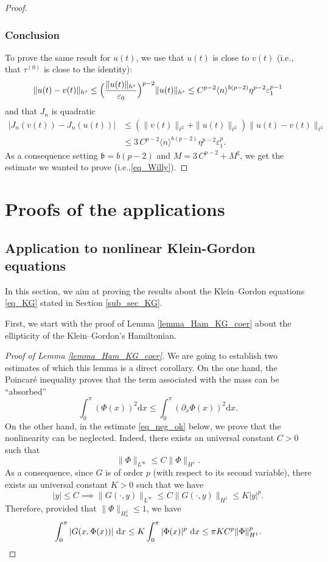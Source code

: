 \documentclass[11pt]{article}
\newcommand{\ie}{i.e.,\xspace}
\theoremstyle{definition}
\begin{document}
\begin{proof}
\subsubsection*{Conclusion}
To prove the same result for $u(t)$, we use that $u(t)$ is close to $v(t)$ (\ie that $\tau^{(0)}$ is close to the identity):
\[
\| u(t) - v(t) \|_{h^s} \leq \Bigl(\frac{\|u(t) \|_{h^s}}{\varepsilon_0} \Bigr)^{p-2} \| u(t) \|_{h^s} \leq C^{p-2} \langle n \rangle^{b(p-2)} \eta^{p-2} \varepsilon_1^{p-1}
\]
and that $J_n$ is quadratic
\begin{equation*}
\begin{split}
| J_n(v(t)) - J_n(u(t)) | &\leq (\| v(t) \|_{\ell^2} + \| u(t) \|_{\ell^2}) \| u(t) -v(t)\|_{\ell^2} \\
&\leq 3 \, C^{p-2} \langle n \rangle^{b(p-2)} \eta^{p-2} \varepsilon_1^{p}.
\end{split}
\end{equation*}
As a consequence setting $\mathfrak{b} = b(p-2)$ and $M = 3 \, C^{p-2} + M^\sharp$, we get the estimate we wanted to prove (\ie \eqref{eq_Willy}).
\end{proof}

\section{Proofs of the applications}
\label{sec_proofs}

\subsection{Application to nonlinear Klein-Gordon equations}
\label{sec_KG}
In this section, we aim at proving the results about the Klein--Gordon equations \eqref{eq_KG} stated in Section \ref{sub_sec_KG}.

First, we start with the proof of Lemma \ref{lemma_Ham_KG_coer} about the ellipticity of the Klein--Gordon's Hamiltonian.
\begin{proof}[Proof of Lemma \ref{lemma_Ham_KG_coer}] We are going to establish two estimates of which this lemma is a direct corollary. On the one hand, the Poincaré inequality proves that the term associated with the mass can be ``absorbed''
\[
\int_0^\pi (\Phi(x))^2 \mathrm{d}x \leq \int_0^\pi (\partial_x \Phi(x))^2 \mathrm{d}x.
\]
On the other hand, in the estimate \eqref{eq_neg_ok} below, we prove that the nonlinearity can be neglected. Indeed, there exists an universal constant $C>0$ such that
\[
\| \Phi \|_{L^\infty} \leq C \| \Phi \|_{H^1}.
\]
As a consequence, since $G$ is of order $p$ (with respect to its second variable), there exists an universal constant $K>0$ such that we have
\[
|y|\leq C \implies \|G(\cdot,y)\|_{L^\infty} \leq C\|G(\cdot,y)\|_{H^1} \leq K |y|^p.
\]
Therefore, provided that $\| \Phi \|_{H^1_0}\leq 1$, we have
\begin{equation}
\label{eq_neg_ok}
\int_0^\pi |G(x,\Phi(x))| \ \mathrm{d}x \leq K \int_0^\pi |\Phi(x)|^p \ \mathrm{d}x \leq \pi K C^p \| \Phi \|_{H^1}^p.\qedhere
\end{equation}
\end{proof}
\end{document}
